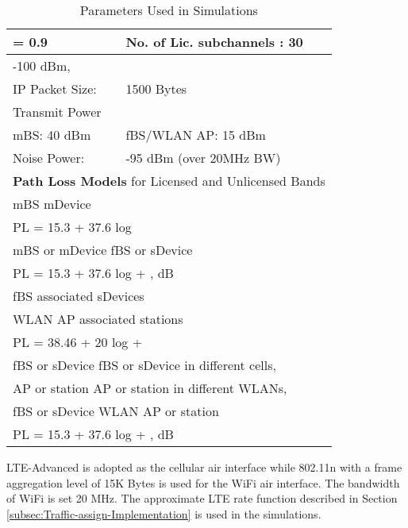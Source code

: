 \documentclass[journal,final,letterpaper,10pt,doublecolumn,twoside]{IEEEtran}
\begin{document}
\begin{table}\caption{Parameters Used in Simulations} \centering
\begin{tabular}{|ll|}
\hline
  = 0.9  &   No. of Lic. subchannels : 30   \\
\hline
\multicolumn{2}{|l|}{  -100 dBm,    } \\
\hline
IP Packet Size:   & 1500 Bytes \\
\hline
Transmit Power  &            \\
mBS:      40 dBm   &      fBS/WLAN AP:      15 dBm \\
\hline
Noise Power: &  -95 dBm (over 20MHz BW)          \\
\hline

\multicolumn{2}{|l|}{\textbf{Path Loss Models} for Licensed and Unlicensed Bands}      \\
\hline \multicolumn{2}{|l|}{mBS  mDevice }      \\
\multicolumn{2}{|l|}{PL = 15.3 + 37.6 log }      \\
\hline \multicolumn{2}{|l|}{mBS or mDevice  fBS or sDevice }      \\
\multicolumn{2}{|l|}{PL = 15.3 + 37.6 log + , dB  }     \\
\hline
\multicolumn{2}{|l|}{fBS  associated sDevices }     \\
\multicolumn{2}{|l|}{WLAN AP  associated stations  }      \\
\multicolumn{2}{|l|}{PL = 38.46 + 20 log +  }\\
\hline
\multicolumn{2}{|l|}{fBS or sDevice  fBS or sDevice in different cells, }      \\
\multicolumn{2}{|l|}{AP or station  AP or station in different WLANs, }   \\
\multicolumn{2}{|l|}{fBS or sDevice  WLAN AP or station  }    \\
\multicolumn{2}{|l|}{PL = 15.3 + 37.6 log + , dB  }     \\
\hline
\end{tabular}
\label{table:parameters}
\end{table}







LTE-Advanced \cite{LTE-A} is adopted as the cellular air interface while
802.11n \cite{802.11n} with a frame aggregation level of 15K Bytes is used for the WiFi air interface.
The bandwidth of WiFi is set 20 MHz.
The approximate LTE rate function described in Section \ref{subsec:Traffic-assign-Implementation} is used in the simulations.
\end{document}
